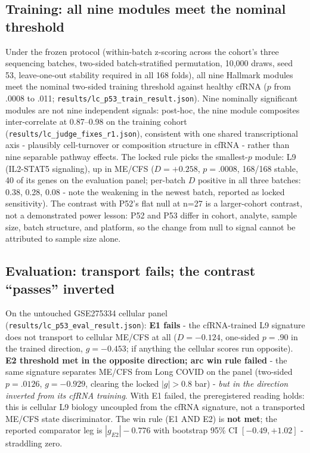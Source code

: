 \documentclass[11pt,a4paper]{article}
\begin{document}
\subsection{Training: all nine modules meet the nominal threshold}
Under the frozen protocol (within-batch z-scoring across the cohort's three
sequencing batches, two-sided batch-stratified permutation, 10{,}000 draws,
seed 53, leave-one-out stability required in all 168 folds), all nine
Hallmark modules meet the nominal two-sided training threshold against
healthy cfRNA ($p$ from .0008 to .011;
\texttt{results/lc\_p53\_train\_result.json}). Nine nominally significant
modules are not nine independent signals: post-hoc, the nine module
composites inter-correlate at 0.87--0.98 on the training cohort
(\texttt{results/lc\_judge\_fixes\_r1.json}), consistent with one shared
transcriptional axis - plausibly cell-turnover or composition structure in
cfRNA - rather than nine separable pathway effects. The locked rule picks
the smallest-$p$ module: L9 (IL2-STAT5 signaling), up in ME/CFS
($D=+0.258$, $p=.0008$, 168/168 stable, 40 of its genes on the evaluation
panel; per-batch $D$ positive in all three batches: 0.38, 0.28, 0.08 - note
the weakening in the newest batch, reported as locked sensitivity). The
contrast with P52's flat null at n=27 is a larger-cohort contrast, not a
demonstrated power lesson: P52 and P53 differ in cohort, analyte, sample
size, batch structure, and platform, so the change from null to signal
cannot be attributed to sample size alone.

\subsection{Evaluation: transport fails; the contrast ``passes'' inverted}
On the untouched GSE275334 cellular panel
(\texttt{results/lc\_p53\_eval\_result.json}): \textbf{E1 fails} - the
cfRNA-trained L9 signature does not transport to cellular ME/CFS at all
($D=-0.124$, one-sided $p=.90$ in the trained direction, $g=-0.453$;
if anything the cellular scores run opposite). \textbf{E2 threshold met in the opposite direction; arc win rule failed} -
the same signature separates ME/CFS from Long COVID on the panel (two-sided
$p=.0126$, $g=-0.929$, clearing the locked $|g|>0.8$ bar) - \emph{but in the
direction inverted from its cfRNA training}. With E1 failed, the preregistered
reading holds: this is cellular L9 biology uncoupled from the cfRNA
signature, not a transported ME/CFS state discriminator. The win rule
(E1 AND E2) is \textbf{not met}; the reported comparator leg is
$|g_{E2}|-0.776$ with bootstrap 95\% CI $[-0.49, +1.02]$ - straddling zero.
\end{document}
